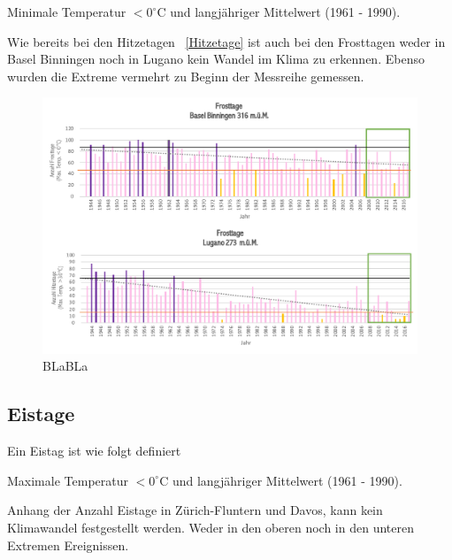 \begin{refsection}
\begin{definition}
Minimale Temperatur $< 0^{\circ}$C und langjähriger Mittelwert (1961 - 1990).
\end{definition}



Wie bereits bei den Hitzetagen ~\ref{Hitzetage}  ist auch bei den Frosttagen weder in Basel Binningen noch in Lugano kein Wandel im Klima zu erkennen. Ebenso wurden die Extreme vermehrt zu Beginn der Messreihe gemessen.

\begin{figure}[htbp]
\centering
\includegraphics[width=1.0\textwidth]{extrem/Frosttage.pdf}
\caption{BLaBLa}
\label{Frosttage}
\end{figure}



\subsection{Eistage}
Ein Eistag ist wie folgt definiert

\begin{definition}
Maximale Temperatur $< 0^{\circ}$C und langjähriger Mittelwert (1961 - 1990).
\end{definition}


Anhang der Anzahl Eistage in Zürich-Fluntern und Davos, kann kein Klimawandel festgestellt werden. Weder in den oberen noch in den unteren Extremen Ereignissen.



\end{refsection}
